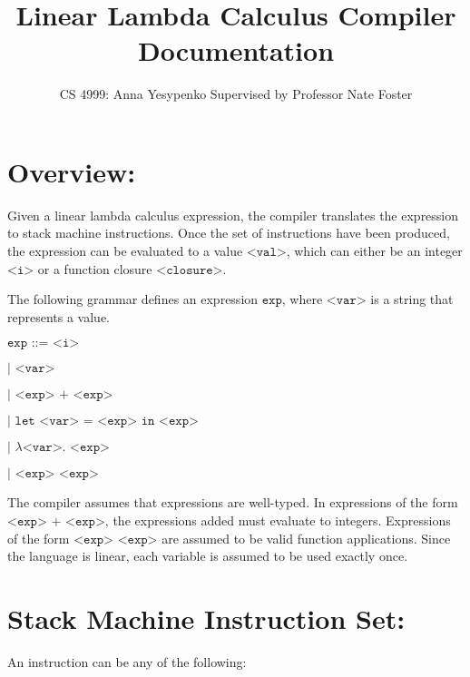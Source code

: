 \documentclass[11pt]{article}
\begin{document}
\title{Linear Lambda Calculus Compiler Documentation}
\author{CS 4999: Anna Yesypenko Supervised by Professor Nate Foster}
\maketitle

\section*{Overview:}

Given a linear lambda calculus expression, the compiler translates the expression to stack machine instructions. Once the set of instructions have been produced, the expression can be evaluated to a value $\texttt{<val>}$, which can either be an integer $\texttt{<i>}$ or a function closure $\texttt{<closure>}$. 

\medskip
The following grammar defines an expression $\texttt{exp}$, where $\texttt{<var>}$ is a string that represents a value.

\vspace{5mm}

$\texttt{exp ::= <i>}$

\hspace{12 mm} $\texttt {| <var>}$ 

\hspace{12 mm} $\texttt {| <exp> + <exp>}$ 

\hspace{12 mm} $\texttt{| let <var> = <exp> in <exp>}$

\hspace{12 mm} $\texttt {| } \lambda \texttt{<var>. <exp>}$ 

\hspace{12 mm} $\texttt{| <exp> <exp>}$

\vspace{5mm}

The compiler assumes that expressions are well-typed. In expressions of the form $\texttt {<exp> + <exp>}$, the expressions added must evaluate to integers. Expressions of the form $\texttt{<exp> <exp>}$ are assumed to be valid function applications. Since the language is linear, each variable is assumed to be used exactly once.

\section*{Stack Machine Instruction Set:}

An instruction can be any of the following:
\end{document}
